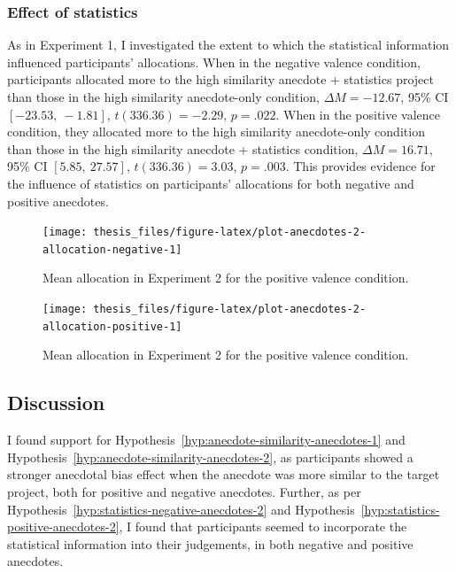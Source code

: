 \documentclass[a4paper, nobind, dvipsnames]{templates/ociamthesis}
\theoremstyle{definition}
\theoremstyle{definition}
\theoremstyle{definition}
\theoremstyle{definition}
\theoremstyle{remark}
\begin{document}
\subsubsection{Effect of statistics}

As in Experiment 1, I investigated the extent to which the statistical
information influenced participants' allocations. When in the negative valence
condition, participants allocated more to the high similarity anecdote +
statistics project than those in the high similarity anecdote-only condition,
\(\Delta M = -12.67\), 95\% CI \([-23.53,~-1.81]\), \(t(336.36) = -2.29\), \(p = .022\).
When in the positive valence condition, they allocated more to the high similarity
anecdote-only condition than those in the high similarity anecdote + statistics condition,
\(\Delta M = 16.71\), 95\% CI \([5.85,~27.57]\), \(t(336.36) = 3.03\), \(p = .003\). This provides
evidence for the influence of statistics on participants' allocations for both
negative and positive anecdotes.



\begin{figure}
\texttt{[image: thesis\_files/figure-latex/plot-anecdotes-2-allocation-negative-1]} \caption{Mean allocation in Experiment 2 for the positive valence condition.}\label{fig:plot-anecdotes-2-allocation-negative}
\end{figure}



\begin{figure}
\texttt{[image: thesis\_files/figure-latex/plot-anecdotes-2-allocation-positive-1]} \caption{Mean allocation in Experiment 2 for the positive valence condition.}\label{fig:plot-anecdotes-2-allocation-positive}
\end{figure}

\subsection{Discussion}

I found support for Hypothesis~\ref{hyp:anecdote-similarity-anecdotes-1} and
Hypothesis~\ref{hyp:anecdote-similarity-anecdotes-2}, as participants showed a
stronger anecdotal bias effect when the anecdote was more similar to the target
project, both for positive and negative anecdotes. Further, as per
Hypothesis~\ref{hyp:statistics-negative-anecdotes-2} and
Hypothesis~\ref{hyp:statistics-positive-anecdotes-2}, I found that participants
seemed to incorporate the statistical information into their judgements, in both
negative and positive anecdotes.
\end{document}
